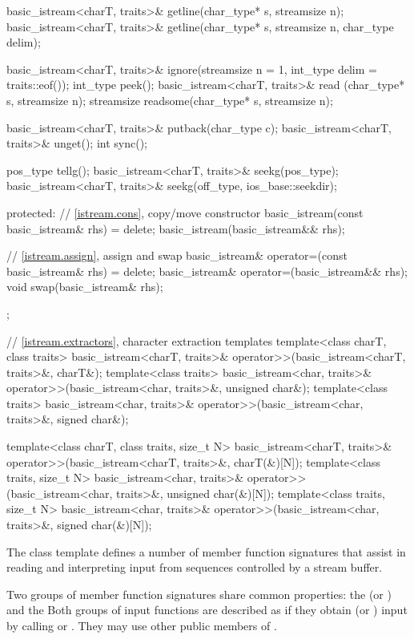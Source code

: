 \begin{codeblock}
{{    basic_istream<charT, traits>& getline(char_type* s, streamsize n);
    basic_istream<charT, traits>& getline(char_type* s, streamsize n, char_type delim);

    basic_istream<charT, traits>& ignore(streamsize n = 1, int_type delim = traits::eof());
    int_type                      peek();
    basic_istream<charT, traits>& read    (char_type* s, streamsize n);
    streamsize                    readsome(char_type* s, streamsize n);

    basic_istream<charT, traits>& putback(char_type c);
    basic_istream<charT, traits>& unget();
    int sync();

    pos_type tellg();
    basic_istream<charT, traits>& seekg(pos_type);
    basic_istream<charT, traits>& seekg(off_type, ios_base::seekdir);

  protected:
    // \ref{istream.cons}, copy/move constructor
    basic_istream(const basic_istream& rhs) = delete;
    basic_istream(basic_istream&& rhs);

    // \ref{istream.assign}, assign and swap
    basic_istream& operator=(const basic_istream& rhs) = delete;
    basic_istream& operator=(basic_istream&& rhs);
    void swap(basic_istream& rhs);
  };

  // \ref{istream.extractors}, character extraction templates
  template<class charT, class traits>
    basic_istream<charT, traits>& operator>>(basic_istream<charT, traits>&, charT&);
  template<class traits>
    basic_istream<char, traits>& operator>>(basic_istream<char, traits>&, unsigned char&);
  template<class traits>
    basic_istream<char, traits>& operator>>(basic_istream<char, traits>&, signed char&);

  template<class charT, class traits, size_t N>
    basic_istream<charT, traits>& operator>>(basic_istream<charT, traits>&, charT(&)[N]);
  template<class traits, size_t N>
    basic_istream<char, traits>& operator>>(basic_istream<char, traits>&, unsigned char(&)[N]);
  template<class traits, size_t N>
    basic_istream<char, traits>& operator>>(basic_istream<char, traits>&, signed char(&)[N]);
}
\end{codeblock}

\pnum
The class template
defines a number of member function
signatures that assist in reading and interpreting input from sequences
controlled by a stream buffer.

\pnum
Two groups of member function signatures share common properties:
the
(or
)
and the
Both groups of input functions are described as if they obtain (or
)
input
by calling
or
.
They may use other public members of
.


